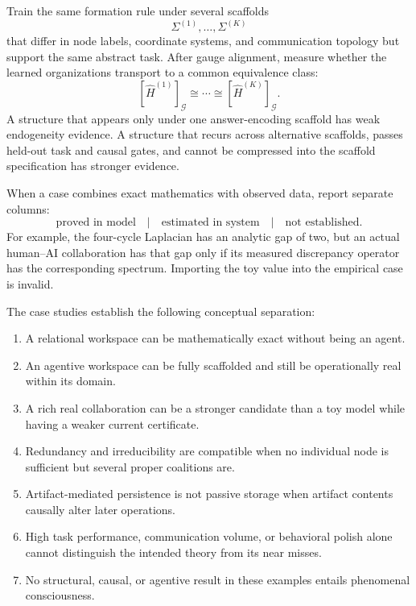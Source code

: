 
Train the same formation rule under several scaffolds
\[
\Sigma^{(1)},\ldots,\Sigma^{(K)}
\]
that differ in node labels, coordinate systems, and communication topology but
support the same abstract task. After gauge alignment, measure whether the
learned organizations transport to a common equivalence class:
\[
[\widehat H^{(1)}]_{\mathcal G}
\cong\cdots\cong
[\widehat H^{(K)}]_{\mathcal G}.
\]
A structure that appears only under one answer-encoding scaffold has weak
endogeneity evidence. A structure that recurs across alternative scaffolds,
passes held-out task and causal gates, and cannot be compressed into the
scaffold specification has stronger evidence.


When a case combines exact mathematics with observed data, report separate
columns:
\[
\boxed{
\text{proved in model}
\quad\big|\quad
\text{estimated in system}
\quad\big|\quad
\text{not established}.
}
\]
For example, the four-cycle Laplacian has an analytic gap of two, but an actual
human--AI collaboration has that gap only if its measured discrepancy operator
has the corresponding spectrum. Importing the toy value into the empirical
case is invalid.


The case studies establish the following conceptual separation:
\begin{enumerate}
\item A relational workspace can be mathematically exact without being an
 agent.
\item An agentive workspace can be fully scaffolded and still be operationally
 real within its domain.
\item A rich real collaboration can be a stronger candidate than a toy model
 while having a weaker current certificate.
\item Redundancy and irreducibility are compatible when no individual node is
 sufficient but several proper coalitions are.
\item Artifact-mediated persistence is not passive storage when artifact
 contents causally alter later operations.
\item High task performance, communication volume, or behavioral polish alone
 cannot distinguish the intended theory from its near misses.
\item No structural, causal, or agentive result in these examples entails
 phenomenal consciousness.
\end{enumerate}

